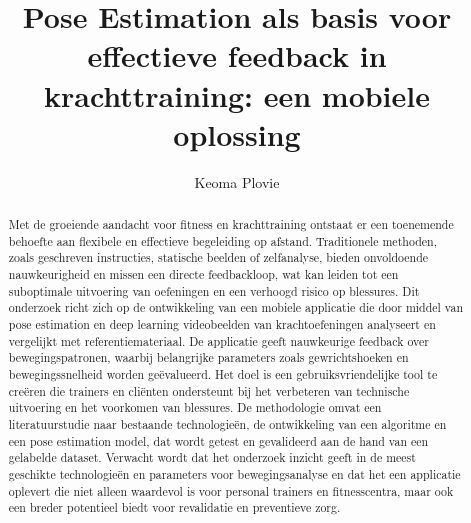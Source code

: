 \documentclass{hogent-article}
\title{Pose Estimation als basis voor effectieve feedback in krachttraining: een mobiele oplossing}
\author{Keoma Plovie}
\begin{document}
\begin{abstract}
  Met de groeiende aandacht voor fitness en krachttraining ontstaat er een toenemende behoefte aan flexibele en effectieve begeleiding op afstand. Traditionele methoden, zoals geschreven instructies, statische beelden of zelfanalyse, bieden onvoldoende nauwkeurigheid en missen een directe feedbackloop, wat kan leiden tot een suboptimale uitvoering van oefeningen en een verhoogd risico op blessures. Dit onderzoek richt zich op de ontwikkeling van een mobiele applicatie die door middel van pose estimation en deep learning videobeelden van krachtoefeningen analyseert en vergelijkt met referentiemateriaal. De applicatie geeft nauwkeurige feedback over bewegingspatronen, waarbij belangrijke parameters zoals gewrichtshoeken en bewegingssnelheid worden geëvalueerd. Het doel is een gebruiksvriendelijke tool te creëren die trainers en cliënten ondersteunt bij het verbeteren van technische uitvoering en het voorkomen van blessures. De methodologie omvat een literatuurstudie naar bestaande technologieën, de ontwikkeling van een algoritme en een pose estimation model, dat wordt getest en gevalideerd aan de hand van een gelabelde dataset. Verwacht wordt dat het onderzoek inzicht geeft in de meest geschikte technologieën en parameters voor bewegingsanalyse en dat het een applicatie oplevert die niet alleen waardevol is voor personal trainers en fitnesscentra, maar ook een breder potentieel biedt voor revalidatie en preventieve zorg.
\end{abstract}

\tableofcontents



\printbibliography[heading=bibintoc]
\end{document}
